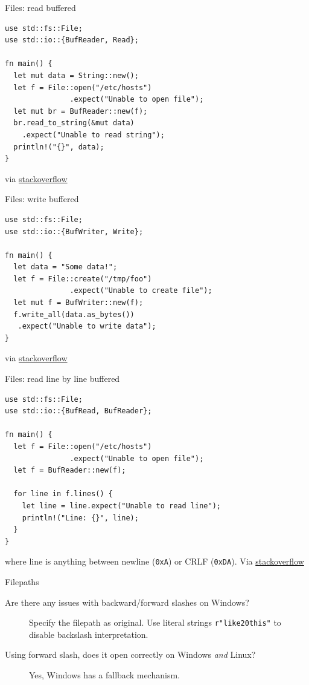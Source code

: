 \documentclass{beamer}
\begin{document}
\begin{frame}[fragile]{Files: read buffered}
  \begin{verbatim}
use std::fs::File;
use std::io::{BufReader, Read};

fn main() {
  let mut data = String::new();
  let f = File::open("/etc/hosts")
               .expect("Unable to open file");
  let mut br = BufReader::new(f);
  br.read_to_string(&mut data)
    .expect("Unable to read string");
  println!("{}", data);
}
  \end{verbatim}
  via \href{https://stackoverflow.com/a/31193386}{stackoverflow}
\end{frame}

\begin{frame}[fragile]{Files: write buffered}
  \begin{verbatim}
use std::fs::File;
use std::io::{BufWriter, Write};

fn main() {
  let data = "Some data!";
  let f = File::create("/tmp/foo")
               .expect("Unable to create file");
  let mut f = BufWriter::new(f);
  f.write_all(data.as_bytes())
   .expect("Unable to write data");
}
  \end{verbatim}
  via \href{https://stackoverflow.com/a/31193386}{stackoverflow}
\end{frame}

\begin{frame}[fragile]{Files: read line by line buffered}
  \begin{verbatim}
use std::fs::File;
use std::io::{BufRead, BufReader};

fn main() {
  let f = File::open("/etc/hosts")
               .expect("Unable to open file");
  let f = BufReader::new(f);

  for line in f.lines() {
    let line = line.expect("Unable to read line");
    println!("Line: {}", line);
  }
}
\end{verbatim}
  where line is anything between newline (\texttt{0xA}) or CRLF (\texttt{0xDA}).
  Via \href{https://stackoverflow.com/a/31193386}{stackoverflow}
\end{frame}

\begin{frame}[fragile]{Filepaths}
  \begin{description}
    \item[Are there any issues with backward/forward slashes on Windows?] Specify the filepath as original. Use literal strings \texttt{r"like\x20this"} to disable backslash interpretation.
    \item[Using forward slash, does it open correctly on Windows \emph{and} Linux?] Yes, Windows has a fallback mechanism.
  \end{description}
\end{frame}
\end{document}
